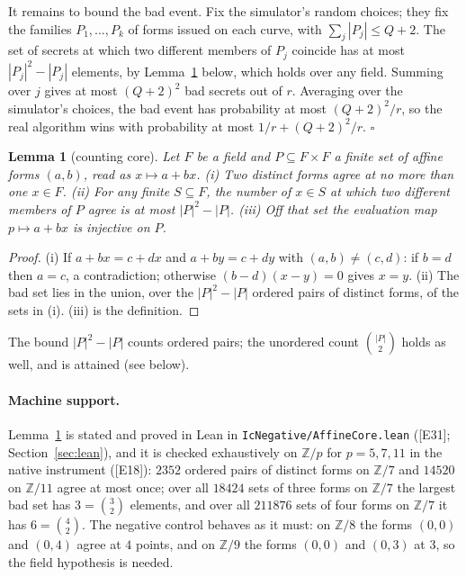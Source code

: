 \documentclass[10pt,a4paper]{article}
\newcommand{\ZZ}{\mathbb{Z}}
\newcommand{\ev}[1]{\textup{[#1]}}
\newtheorem{lemma}[theorem]{Lemma}
\theoremstyle{definition}
\theoremstyle{remark}
\begin{document}
It remains to bound the bad event. Fix the simulator's random choices; they fix the
families $P_1,\dots,P_k$ of forms issued on each curve, with
$\sum_j |P_j|\le Q+2$. The set of secrets at which two different members of $P_j$
coincide has at most $|P_j|^2-|P_j|$ elements, by Lemma~\ref{lem:core} below, which
holds over any field. Summing over $j$ gives at most $(Q+2)^2$ bad secrets out of
$r$. Averaging over the simulator's choices, the bad event has probability at most
$(Q+2)^2/r$, so the real algorithm wins with probability at most
$1/r+(Q+2)^2/r$. $\square$

\begin{lemma}[counting core]
\label{lem:core}
Let $F$ be a field and $P\subseteq F\times F$ a finite set of affine forms
$(a,b)$, read as $x\mapsto a+bx$. (i) Two distinct forms agree at no more than one
$x\in F$. (ii) For any finite $S\subseteq F$, the number of $x\in S$ at which two
different members of $P$ agree is at most $|P|^2-|P|$. (iii) Off that set the
evaluation map $p\mapsto a+bx$ is injective on $P$.
\end{lemma}
\begin{proof}
(i) If $a+bx=c+dx$ and $a+by=c+dy$ with $(a,b)\neq(c,d)$: if $b=d$ then $a=c$, a
contradiction; otherwise $(b-d)(x-y)=0$ gives $x=y$. (ii) The bad set lies in the
union, over the $|P|^2-|P|$ ordered pairs of distinct forms, of the sets in (i).
(iii) is the definition. \qedhere
\end{proof}

The bound $|P|^2-|P|$ counts ordered pairs; the unordered count $\binom{|P|}{2}$
holds as well, and is attained (see below).

\paragraph{Machine support.}
Lemma~\ref{lem:core} is stated and proved in Lean in
\texttt{IcNegative/AffineCore.lean} (\ev{E31}; Section~\ref{sec:lean}), and it is
checked exhaustively on $\ZZ/p$ for $p=5,7,11$ in the native instrument
(\ev{E18}): $2352$ ordered pairs of distinct forms on $\ZZ/7$ and $14520$ on
$\ZZ/11$ agree at most once; over all $18424$ sets of three forms on $\ZZ/7$ the
largest bad set has $3=\binom32$ elements, and over all $211876$ sets of four forms
on $\ZZ/7$ it has $6=\binom42$. The negative control behaves as it must: on $\ZZ/8$
the forms $(0,0)$ and $(0,4)$ agree at $4$ points, and on $\ZZ/9$ the forms
$(0,0)$ and $(0,3)$ at $3$, so the field hypothesis is needed.
\end{document}
